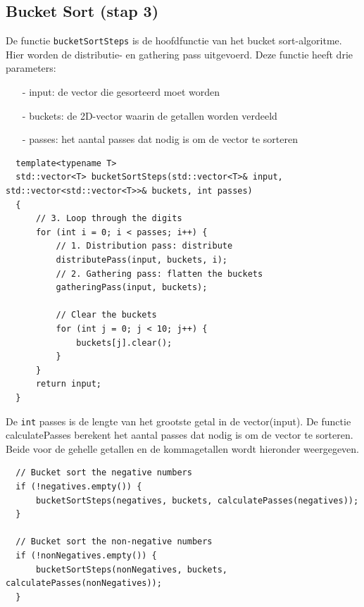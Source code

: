 \documentclass{article}
\begin{document}
\subsection{Bucket Sort (stap 3)}
De functie \texttt{bucketSortSteps} is de hoofdfunctie van het bucket sort-algoritme. Hier worden de distributie- en gathering pass uitgevoerd.
Deze functie heeft drie parameters:
\begin{itemize}
  \item[-] input: de vector die gesorteerd moet worden
  \item[-] buckets: de 2D-vector waarin de getallen worden verdeeld
  \item[-] passes: het aantal passes dat nodig is om de vector te sorteren
\end{itemize}
\begin{lstlisting}
  template<typename T>
  std::vector<T> bucketSortSteps(std::vector<T>& input, std::vector<std::vector<T>>& buckets, int passes)
  {
      // 3. Loop through the digits
      for (int i = 0; i < passes; i++) {
          // 1. Distribution pass: distribute
          distributePass(input, buckets, i);
          // 2. Gathering pass: flatten the buckets
          gatheringPass(input, buckets);

          // Clear the buckets
          for (int j = 0; j < 10; j++) {
              buckets[j].clear();
          }
      }
      return input;
  }
\end{lstlisting}
De \texttt{int} passes is de lengte van het grootste getal in de vector(input). 
De functie calculatePasses berekent het aantal passes dat nodig is om de vector te sorteren. 
Beide voor de gehelle getallen en de kommagetallen wordt hieronder weergegeven.
\begin{lstlisting}
  // Bucket sort the negative numbers
  if (!negatives.empty()) {
      bucketSortSteps(negatives, buckets, calculatePasses(negatives));
  }
  
  // Bucket sort the non-negative numbers
  if (!nonNegatives.empty()) {
      bucketSortSteps(nonNegatives, buckets, calculatePasses(nonNegatives));
  }
\end{lstlisting}
\end{document}
